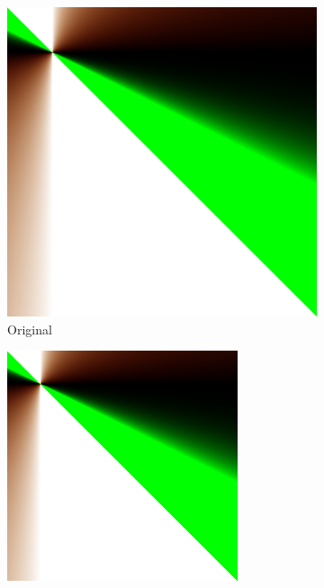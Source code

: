 \documentclass{article}
\begin{document}
\begin{figure}[ht]
  \centering
  \begin{subfigure}{0.23\textwidth}
    \centering
    \includegraphics[width=\textwidth]{polinomial/polinomial.png}
    \caption{Original}
  \end{subfigure}%
  \hfill
  \begin{subfigure}{0.23\textwidth}
    \centering
    \includegraphics[width=\textwidth]{polinomial/h-10/compressed.png}

\end{subfigure}
\end{figure}
\end{document}
